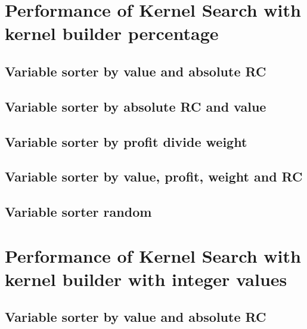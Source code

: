 \newpage
\section{Performance of Kernel Search with kernel builder percentage}\label{Instances results kernel percentage}

\newpage
\subsection{Variable sorter by value and absolute RC}


\newpage
\subsection{Variable sorter by absolute RC and value}


\newpage
\subsection{Variable sorter by profit divide weight}


\newpage
\subsection{Variable sorter by value, profit, weight and RC}


\newpage
\subsection{Variable sorter random}


\newpage
\section{Performance of Kernel Search with kernel builder with integer values}\label{Instances results kernel int values}

\newpage
\subsection{Variable sorter by value and absolute RC}


